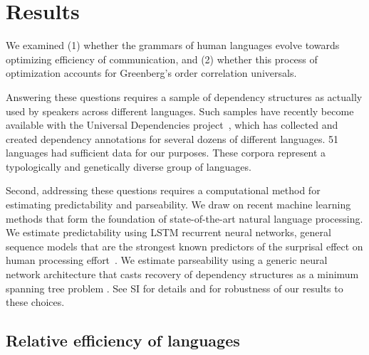 \documentclass[9pt,twocolumn,twoside,lineno]{pnas-new}
\begin{document}
\section{Results}

We examined 
(1) whether the grammars of human languages evolve towards optimizing efficiency of communication, and
(2) whether this process of optimization accounts  for Greenberg's order correlation universals.

Answering these questions requires a sample of dependency structures as actually used by speakers across different languages.
Such samples have recently become available with the Universal Dependencies project~\cite{nivre2017universal}, which has collected and created dependency annotations for several dozens of different languages.
51 languages had sufficient data for our purposes. %
These corpora represent a typologically and genetically diverse group of languages.

Second, addressing these questions requires a computational method for estimating predictability and parseability.
We draw on recent machine learning methods that form the foundation of state-of-the-art natural language processing.
We estimate predictability using LSTM recurrent neural networks, general sequence models that are the strongest known predictors of the surprisal effect on human processing effort~\citep{frank2011insensitivity,goodkind2018predictive}.
We estimate parseability using a generic neural network architecture that casts recovery of dependency structures as a minimum spanning tree problem \citep{dozat2017stanford, zhang2017dependency}.
See SI for details and for robustness of our results to these choices.

\subsection{Relative efficiency of languages}
\label{sec:relative-efficiency}
\end{document}
